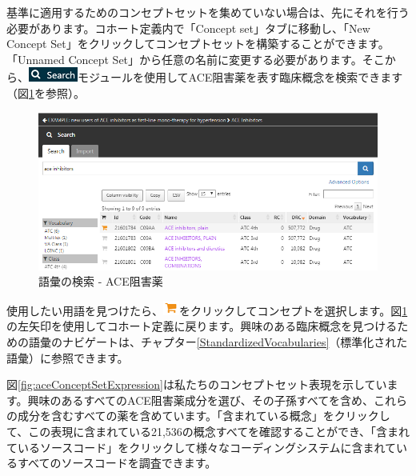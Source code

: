 \documentclass[
  11pt]{book}
\theoremstyle{definition}
\theoremstyle{definition}
\theoremstyle{definition}
\theoremstyle{definition}
\theoremstyle{remark}
\begin{document}
基準に適用するためのコンセプトセットを集めていない場合は、先にそれを行う必要があります。コホート定義内で「Concept set」タブに移動し、「New Concept Set」をクリックしてコンセプトセットを構築することができます。「Unnamed Concept Set」から任意の名前に変更する必要があります。そこから、\includegraphics{images/Cohorts/search-2.png}モジュールを使用してACE阻害薬を表す臨床概念を検索できます（図\ref{fig:aceinhibitors}を参照）。

\begin{figure}

{\centering \includegraphics[width=1\linewidth]{images/Cohorts/aceinhibitors} 

}

\caption{語彙の検索 - ACE阻害薬}\label{fig:aceinhibitors}
\end{figure}

使用したい用語を見つけたら、\includegraphics{images/Cohorts/shoppingcart.png}をクリックしてコンセプトを選択します。図\ref{fig:aceinhibitors}の左矢印を使用してコホート定義に戻ります。興味のある臨床概念を見つけるための語彙のナビゲートは、チャプター\ref{StandardizedVocabularies}（標準化された語彙）に参照できます。

図\ref{fig:aceConceptSetExpression}は私たちのコンセプトセット表現を示しています。興味のあるすべてのACE阻害薬成分を選び、その子孫すべてを含め、これらの成分を含むすべての薬を含めています。「含まれている概念」をクリックして、この表現に含まれている21,536の概念すべてを確認することができ、「含まれているソースコード」をクリックして様々なコーディングシステムに含まれているすべてのソースコードを調査できます。
\end{document}
